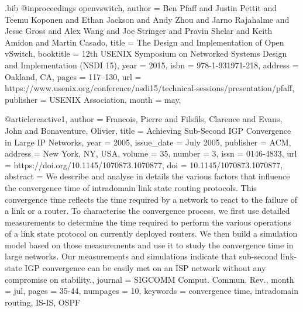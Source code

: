 \documentclass[sigconf]{acmart}
\begin{document}
\begin{filecontents}{\jobname.bib}
@inproceedings {openvswitch,
author = {Ben Pfaff and Justin Pettit and Teemu Koponen and Ethan Jackson and Andy Zhou and Jarno Rajahalme and Jesse Gross and Alex Wang and Joe Stringer and Pravin Shelar and Keith Amidon and Martin Casado},
title = {The Design and Implementation of Open vSwitch},
booktitle = {12th {USENIX} Symposium on Networked Systems Design and Implementation ({NSDI} 15)},
year = {2015},
isbn = {978-1-931971-218},
address = {Oakland, CA},
pages = {117--130},
url = {https://www.usenix.org/conference/nsdi15/technical-sessions/presentation/pfaff},
publisher = {{USENIX} Association},
month = may,
}


@article{reactive1, author = {Francois, Pierre and Filsfils, Clarence and Evans, John and Bonaventure, Olivier}, title = {Achieving Sub-Second IGP Convergence in Large IP Networks}, year = {2005}, issue_date = {July 2005}, publisher = {ACM}, address = {New York, NY, USA}, volume = {35}, number = {3}, issn = {0146-4833}, url = {https://doi.org/10.1145/1070873.1070877}, doi = {10.1145/1070873.1070877}, abstract = {We describe and analyse in details the various factors that influence the convergence time of intradomain link state routing protocols. This convergence time reflects the time required by a network to react to the failure of a link or a router. To characterise the convergence process, we first use detailed measurements to determine the time required to perform the various operations of a link state protocol on currently deployed routers. We then build a simulation model based on those measurements and use it to study the convergence time in large networks. Our measurements and simulations indicate that sub-second link-state IGP convergence can be easily met on an ISP network without any compromise on stability.}, journal = {SIGCOMM Comput. Commun. Rev.}, month = jul, pages = {35-44}, numpages = {10}, keywords = {convergence time, intradomain routing, IS-IS, OSPF} }



\end{filecontents}
\end{document}
